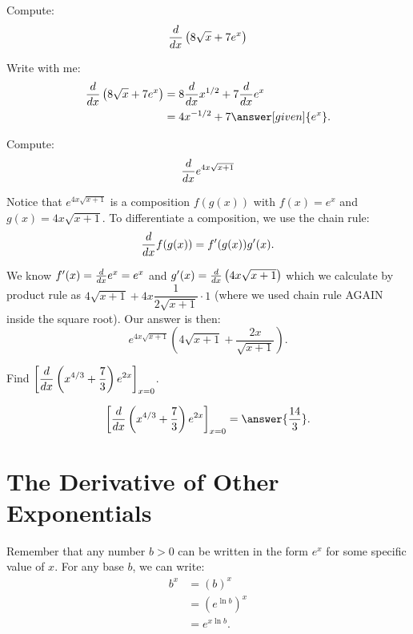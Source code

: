 \documentclass{ximera}
\begin{document}
\begin{example}
Compute:
\[
\frac{d}{\mathop{}\!d x}\left(8\sqrt{x} + 7e^x \right)
\]
	\begin{explanation}
		Write with me:
		\begin{align*}
			\ddx\left(8\sqrt{x} + 7e^x \right) &= 8\ddx x^{1/2} + 7\ddx e^x\\
				&= 4x^{-1/2} + 7 \answer[given]{e^x}.
		\end{align*}
	\end{explanation}
\end{example}




\begin{example}
	Compute: \[ \frac{d}{\mathop{}\!d x} e^{4x\sqrt{x+1}} \]
	\begin{explanation}
		Notice that $e^{4x \sqrt{x+1}}$ is a composition $f(g(x))$ with $f(x) = e^x$ and $g(x) = 4x \sqrt{x+1}$. To differentiate a composition, we use the chain rule: 
		$$\frac{d}{\mathop{}\!d x} f(g(x)) = f'( g(x) ) g'(x).$$  
		
		We know $f'(x) = \frac{d}{\mathop{}\!d x} e^x = e^x$ and $g'(x) = \frac{d}{\mathop{}\!d x} \left( 4x \sqrt{x+1} \right)$ which we calculate by product rule as
		$4 \sqrt{x+1} + 4x \dfrac{1}{2 \sqrt{x+1}} \cdot 1$ (where we used chain rule AGAIN inside the square root).
		Our answer is then:
		\[ e^{4x \sqrt{x+1}}\left( 4\sqrt{x+1} + \dfrac{2x}{\sqrt{x+1}}\right).\]
	\end{explanation}	
\end{example}

\begin{question}
	  Find $\displaystyle \bigg[ \frac{d}{\mathop{}\!d x} \left(x^{4/3}+\frac{7}{3}\right) e^{2x} \bigg]_{x=0}$.
	  
  \begin{prompt}
    \[\displaystyle \eval{\ddx \left(x^{4/3}+\frac{7}{3}\right) e^{2x}}_{x=0} = \answer{\frac{14}{3}}.\]
  \end{prompt}
\end{question}




\section{The Derivative of Other Exponentials}
Remember that any number $b > 0$ can be written in the form $e^x$ for some specific value of $x$. For any base $b$, we can write:
\begin{align*}
	b^x &= (b)^x\\
		&= \left( e^{\ln b} \right)^x\\
		&= e^{x \ln b}.
\end{align*}
\end{document}
